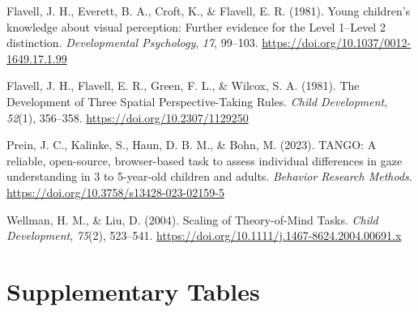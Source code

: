 \documentclass[
  man,mask,floatsintext]{apa7}
\newlength{\cslhangindent}
\newlength{\cslentryspacingunit} %
\newenvironment{CSLReferences}[2] %
 {%
  \setlength{\parindent}{0pt}
  \ifodd #1
  \let\oldpar\par
  \def\par{\hangindent=\cslhangindent\oldpar}
  \fi
  \setlength{\parskip}{#2\cslentryspacingunit}
 }%
 {}
\begin{document}
\hypertarget{refs}{}
\begin{CSLReferences}{1}{0}
\leavevmode{}%
Flavell, J. H., Everett, B. A., Croft, K., \& Flavell, E. R. (1981). Young children's knowledge about visual perception: {Further} evidence for the {Level} 1--{Level} 2 distinction. \emph{Developmental Psychology}, \emph{17}, 99--103. \url{https://doi.org/10.1037/0012-1649.17.1.99}

\leavevmode{}%
Flavell, J. H., Flavell, E. R., Green, F. L., \& Wilcox, S. A. (1981). The {Development} of {Three Spatial Perspective-Taking Rules}. \emph{Child Development}, \emph{52}(1), 356--358. \url{https://doi.org/10.2307/1129250}

\leavevmode{}%
Prein, J. C., Kalinke, S., Haun, D. B. M., \& Bohn, M. (2023). {TANGO}: {A} reliable, open-source, browser-based task to assess individual differences in gaze understanding in 3 to 5-year-old children and adults. \emph{Behavior Research Methods}. \url{https://doi.org/10.3758/s13428-023-02159-5}

\leavevmode{}%
Wellman, H. M., \& Liu, D. (2004). Scaling of {Theory-of-Mind Tasks}. \emph{Child Development}, \emph{75}(2), 523--541. \url{https://doi.org/10.1111/j.1467-8624.2004.00691.x}

\end{CSLReferences}

\endgroup

\newpage

\hypertarget{supplementary-tables}{%
\section{Supplementary Tables}\label{supplementary-tables}}
\end{document}

